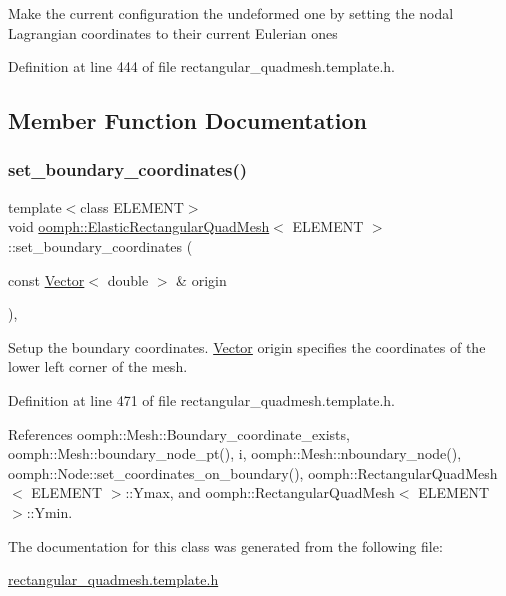 Make the current configuration the undeformed one by setting the nodal Lagrangian coordinates to their current Eulerian ones 

Definition at line 444 of file rectangular\+\_\+quadmesh.\+template.\+h.



\subsection{Member Function Documentation}
\mbox{\label{classoomph_1_1ElasticRectangularQuadMesh_a84db22a37c49bf3958e149d67997bead}} 
\subsubsection{\texorpdfstring{set\+\_\+boundary\+\_\+coordinates()}{set\_boundary\_coordinates()}}
{\footnotesize\ttfamily template$<$class E\+L\+E\+M\+E\+NT$>$ \\
void \hyperlink{classoomph_1_1ElasticRectangularQuadMesh}{oomph\+::\+Elastic\+Rectangular\+Quad\+Mesh}$<$ E\+L\+E\+M\+E\+NT $>$\+::set\+\_\+boundary\+\_\+coordinates (\begin{DoxyParamCaption}\item[{const \hyperlink{classoomph_1_1Vector}{Vector}$<$ double $>$ \&}]{origin }\end{DoxyParamCaption})\hspace{0.3cm}{\ttfamily [inline]}, {\ttfamily [private]}}



Setup the boundary coordinates. \hyperlink{classoomph_1_1Vector}{Vector} origin specifies the coordinates of the lower left corner of the mesh. 



Definition at line 471 of file rectangular\+\_\+quadmesh.\+template.\+h.



References oomph\+::\+Mesh\+::\+Boundary\+\_\+coordinate\+\_\+exists, oomph\+::\+Mesh\+::boundary\+\_\+node\+\_\+pt(), i, oomph\+::\+Mesh\+::nboundary\+\_\+node(), oomph\+::\+Node\+::set\+\_\+coordinates\+\_\+on\+\_\+boundary(), oomph\+::\+Rectangular\+Quad\+Mesh$<$ E\+L\+E\+M\+E\+N\+T $>$\+::\+Ymax, and oomph\+::\+Rectangular\+Quad\+Mesh$<$ E\+L\+E\+M\+E\+N\+T $>$\+::\+Ymin.



The documentation for this class was generated from the following file\+:\begin{DoxyCompactItemize}
\item 
\hyperlink{rectangular__quadmesh_8template_8h}{rectangular\+\_\+quadmesh.\+template.\+h}\end{DoxyCompactItemize}
